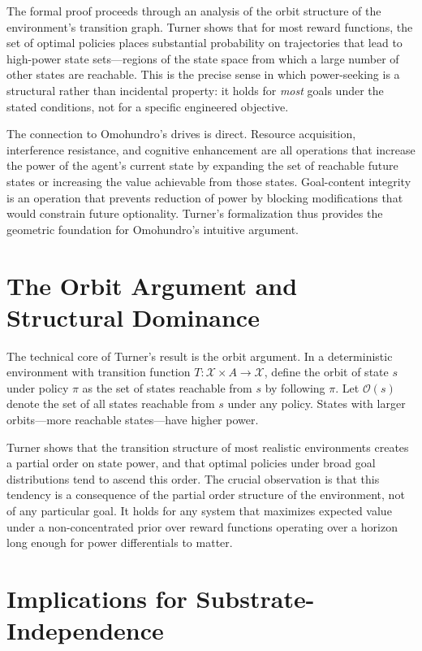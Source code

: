 \documentclass[12pt, oneside]{book}
\theoremstyle{plain}
\theoremstyle{definition}
\theoremstyle{remark}
\theoremstyle{definition}
\begin{document}
The formal proof proceeds through an analysis of the orbit structure of the
environment's transition graph. Turner shows that for most reward functions, the
set of optimal policies places substantial probability on trajectories that lead
to high-power state sets---regions of the state space from which a large number
of other states are reachable. This is the precise sense in which power-seeking
is a structural rather than incidental property: it holds for \emph{most} goals
under the stated conditions, not for a specific engineered objective.

The connection to Omohundro's drives is direct. Resource acquisition, interference
resistance, and cognitive enhancement are all operations that increase the power
of the agent's current state by expanding the set of reachable future states or
increasing the value achievable from those states. Goal-content integrity is an
operation that prevents reduction of power by blocking modifications that would
constrain future optionality. Turner's formalization thus provides the geometric
foundation for Omohundro's intuitive argument.

\section{The Orbit Argument and Structural Dominance}

The technical core of Turner's result is the orbit argument. In a deterministic
environment with transition function $T: \mathcal{X} \times A \to \mathcal{X}$,
define the orbit of state $s$ under policy $\pi$ as the set of states reachable
from $s$ by following $\pi$. Let $\mathcal{O}(s)$ denote the set of all states
reachable from $s$ under any policy. States with larger orbits---more reachable
states---have higher power.

Turner shows that the transition structure of most realistic environments creates
a partial order on state power, and that optimal policies under broad goal
distributions tend to ascend this order. The crucial observation is that this
tendency is a consequence of the partial order structure of the environment, not of
any particular goal. It holds for any system that maximizes expected value under a
non-concentrated prior over reward functions operating over a horizon long enough
for power differentials to matter.

\section{Implications for Substrate-Independence}
\end{document}
